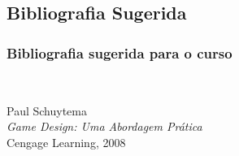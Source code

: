 \expandafter\documentclass\expandafter[table, usenames, svgnames, dvipsnames, \classopts]{beamer}
\begin{document}
\subsection{Bibliografia Sugerida}

\begin{frame} 
	\frametitle{\textbf{Bibliografia sugerida para o curso}}
	
	\begin{columns}[c]
			\begin{center}
				\\
				Paul Schuytema\\
				\textit{Game Design: Uma Abordagem Prática}\\
				Cengage Learning, 2008
			\end{center}
			\begin{center}
				\\

\end{center}
\end{columns}
\end{frame}
\end{document}
